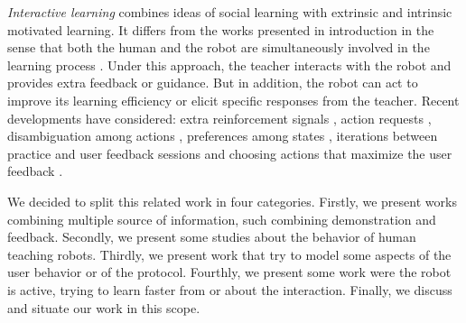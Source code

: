 
\emph{Interactive learning} combines ideas of social learning with extrinsic and intrinsic motivated learning. It differs from the works presented in introduction in the sense that both the human and the robot are simultaneously involved in the learning process \cite{kaplan2002robotic,nicolescu2003natural,breazeal2004tutelage,thomaz2008teachable}. Under this approach, the teacher interacts with the robot and provides extra feedback or guidance. But in addition, the robot can act to improve its learning efficiency or elicit specific responses from the teacher. Recent developments have considered: extra reinforcement signals \cite{thomaz2008teachable}, action requests \cite{macl09airl}, disambiguation among actions \cite{chernova09jair}, preferences among states \cite{Mason2011}, iterations between practice and user feedback sessions \cite{judah2010reinforcement} and choosing actions that maximize the user feedback \cite{knox2009interactively}.

We decided to split this related work in four categories. Firstly, we present works combining multiple source of information, such combining demonstration and feedback. Secondly, we present some studies about the behavior of human teaching robots. Thirdly, we present work that try to model some aspects of the user behavior or of the protocol. Fourthly, we present some work were the robot is active, trying to learn faster from or about the interaction. Finally, we discuss and situate our work in this scope.



